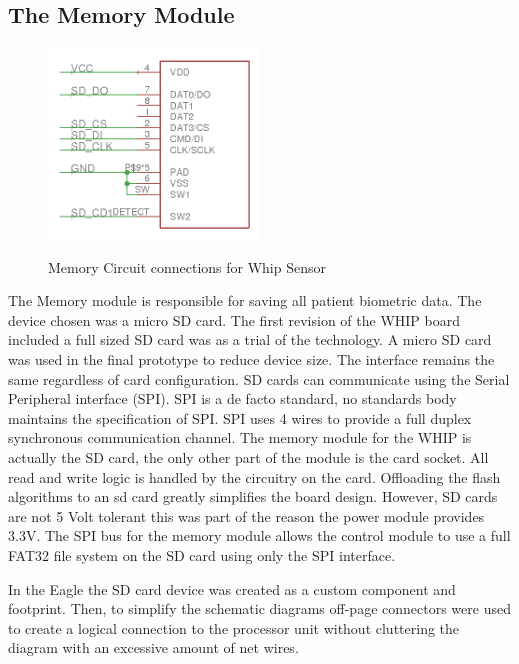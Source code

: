 \subsection {The Memory Module}
\begin{figure}
	\begin{center}
		\label{fig:Rev5_SDCARD}
		\includegraphics[scale=1,width=0.5\textwidth]{Images/Rev5_SDCARD.png} 
		\caption{Memory Circuit connections for Whip Sensor}
	\end{center}
\end{figure}
The Memory module is responsible for saving all patient biometric data. The device chosen was a micro SD card. The first revision of the WHIP board included a full sized SD card was as a trial of the technology. A micro SD card was used in the final prototype to reduce device size. The interface remains the same regardless of card configuration. SD cards can communicate using the Serial Peripheral interface (SPI). SPI is a de facto standard, no standards body maintains the specification of SPI. SPI uses 4 wires to provide a full duplex synchronous communication channel. The memory module for the WHIP is actually the SD card, the only other part of the module is the card socket. All read and write logic is handled by the circuitry on the card. Offloading the flash algorithms to an sd card greatly simplifies the board design. However, SD cards are not 5 Volt tolerant this was part of the reason the power module provides 3.3V. The SPI bus for the memory module allows the control module to use a full FAT32 file system on the SD card using only the SPI interface.

In the Eagle the SD card device was created as a custom component and footprint. Then, to simplify the schematic diagrams off-page connectors were used to create a logical connection to the processor unit without cluttering the diagram with an excessive amount of net wires.


